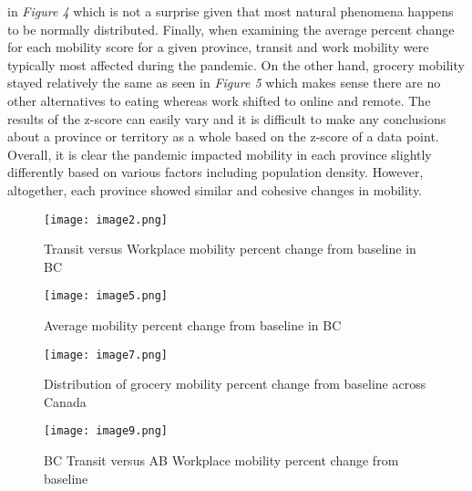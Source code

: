 \documentclass[fontsize=11pt]{article}
\begin{document}
in \emph{Figure 4} which is not a surprise given that most natural phenomena happens to be normally distributed. Finally, when examining the average percent change for each mobility score for a given province, transit and work mobility were typically most affected during the pandemic. On the other hand, grocery mobility stayed relatively the same as seen in \emph{Figure 5} which makes sense there are no other alternatives to eating whereas work shifted to online and remote. The results of the z-score can easily vary and it is difficult to make any conclusions about a province or territory as a whole based on the z-score of a data point. Overall, it is clear the pandemic impacted mobility in each province slightly differently based on various factors including population density. However, altogether, each province showed similar and cohesive changes in mobility.

    \begin{figure}[t]
        \centering

        \begin{minipage}{0.49\textwidth}
            \centering
            \texttt{[image: image2.png]}
            \caption{Transit versus Workplace mobility percent change from baseline in BC}
            \label{fig:1}
        \end{minipage}
        \hfill
        \begin{minipage}{0.49\textwidth}
            \centering
            \texttt{[image: image5.png]}
            \caption{Average mobility percent change from baseline in BC}
            \label{fig:2}
        \end{minipage}

    \end{figure}

    \begin{figure}[t]
        \centering

        \begin{minipage}{0.49\textwidth}
            \centering
            \texttt{[image: image7.png]}
            \caption{Distribution of grocery mobility percent change from baseline across Canada}
            \label{fig:1}
        \end{minipage}
        \hfill
        \begin{minipage}{0.49\textwidth}
            \centering
            \texttt{[image: image9.png]}
            \caption{ BC Transit versus AB Workplace mobility percent change from baseline
            }
            \label{fig:2}
        \end{minipage}

    \end{figure}
\end{document}

